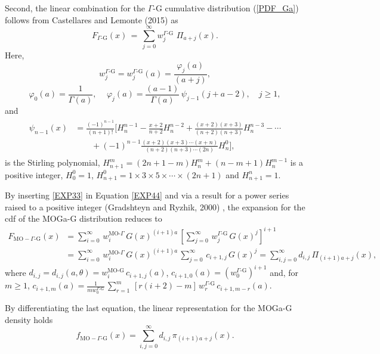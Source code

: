 \documentclass[twoside,leqno,11pt]{article}
\begin{document}
Second, the linear combination for the $\Gamma\text{-G}$ cumulative distribution (\ref{PDF_Ga}) follows from Castellares and Lemonte (2015) \cite{Castellares} as
\begin{equation}\label{EXP33}
F_{\Gamma\text{-G}}(x)\,=\,\sum_{j=0}^\infty w_{j}^{\Gamma\text{-G}}\,\,\Pi_{a+j}(x).
\end{equation}
Here,
$$w_j^{\Gamma\text{-G}}=w_j^{\Gamma\text{-G}}(a)=\frac{\varphi_{j}(a)}{(a+j)},$$
\begin{equation*}\label{coeficientes}
\varphi_0(a)=\frac{1}{\Gamma(a)},
\quad\,
\varphi_j(a)=\frac{(a-1)}{\Gamma(a)}\,\psi_{j-1}(j+a-2),\quad j\geq 1,
\end{equation*}
and
\begin{align*}\label{polinomios_ward}
\begin{split}
\psi_{n-1}(x)&=\frac{(-1)^{n-1}}{(n+1)!}\Biggl[H^{n-1}_{n}-\frac{x+2}{n+2}H^{n-2}_{n}
+ \frac{(x+2)(x+3)}{(n+2)(n+3)}H^{n-3}_{n}- \cdots\\
&\qquad+ (-1)^{n-1}\frac{(x+2)(x+3)\cdots(x+n)}{(n+2)(n+3)\cdots(2n)}H^{0}_{n}\Biggr],
\end{split}
\end{align*}
is the Stirling polynomial, $H^{m}_{n+1}=(2n+1-m)H^{m}_{n} + (n-m+1)H^{m-1}_{n}$ is a positive integer,
$H^0_0=1$, $H^{0}_{n+1}=1\times 3\times 5\times\cdots\times(2n+1)$ and $H^{n}_{n+1}=1$.

By inserting \eqref{EXP33} in Equation \eqref{EXP44} and via a result for a power series raised to a positive integer (Gradshteyn and Ryzhik, 2000) \cite{Gradshteyn}, the expansion for the cdf of the MOGa-G distribution reduces to
\begin{align*}
F_{\text{MO}-\Gamma\text{-G}}(x)&=\sum_{i=0}^{\infty}\,w_{i}^{\text{MO-}\Gamma}\,G(x)^{(i+1)a}\,\left[\sum_{j=0}^{\infty}\,w_{j}^{\Gamma\text{-G}}\,G(x)^{j}\right]^{i+1}\\
&=\sum_{i=0}^{\infty}\,w_{i}^{\text{MO-}\Gamma}\,G(x)^{(i+1)a}\,\sum_{j=0}^{\infty}\,c_{i+1,j}\,G(x)^{j} =\sum_{i,j=0}^\infty d_{i,j}\,\Pi_{(i+1)a+j}(x),
\end{align*}
where $d_{i,j}=d_{i,j}(a,\theta)=w_{i}^{\text{MO-G}}\,c_{i+1,j}(a)$, $c_{i+1,0}(a)=(w_{0}^{\Gamma\text{-G}})^{i+1}$ and, for $m \ge 1$,
$c_{i+1,m}(a)=\frac{1}{m w_{0}^{\Gamma\text{-G}}}\,\sum^{m}_{r=1}\,\left[r(i+2)-m\right]\,w_{r}^{\Gamma\text{-G}}\,c_{i+1,m-r}(a)$.

By differentiating the last equation, the linear representation 
for the MOGa-G density holds
\begin{equation}\label{lcom}
f_{\text{MO}-\Gamma\text{-G}}(x)=\sum_{i,j=0}^\infty d_{i,j}\,\pi_{(i+1)a+j}(x).
\end{equation}
\end{document}
